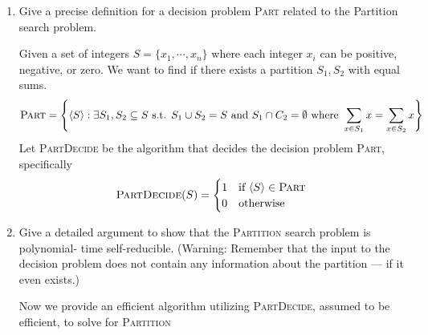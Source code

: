 \documentclass[11pt]{article}
\begin{document}
\begin{enumerate}
    \item  Give a precise definition for a decision problem \textsc{Part} related to the Partition search problem.
    \begin{solution}
        Given a set of integers $S = \{ x_1, \cdots, x_n \}$ where each integer $x_i$ can be positive, negative, or zero. We want to find if there exists a partition $S_1,S_2$ with equal sums. 
        \[
            \textsc{Part} = \left\{ \langle S \rangle : \exists S_1,S_2 \subseteq S \text{ s.t. } S_1\cup S_2 = S \text{ and } S_1 \cap C_2 = \emptyset \text{ where } \sum_{x\in S_1} x = \sum_{x\in S_2} x   \right\}
        \]
        Let \textsc{PartDecide} be the algorithm that decides the decision problem \textsc{Part}, specifically 
        \[
            \textsc{PartDecide}(S)=
            \begin{cases}
                1 & \text{if } \langle S \rangle \in \textsc{Part}\\
                0 & \text{otherwise}\\
            \end{cases}
        \] 
    \end{solution}
    \item Give a detailed argument to show that the \textsc{Partition} search problem is polynomial- time self-reducible. (Warning: Remember that the input to the decision problem does not contain any information about the partition — if it even exists.)
    \begin{solution}
        Now we provide an efficient algorithm utilizing \textsc{PartDecide}, assumed to be efficient, to solve for \textsc{Partition} \\ 
        \begin{algorithm}[H]
\end{algorithm}
\end{solution}
\end{enumerate}
\end{document}
